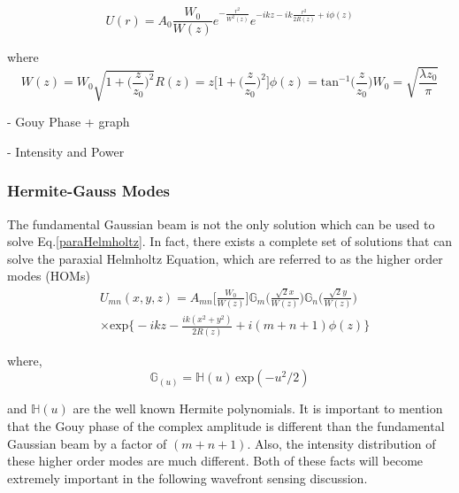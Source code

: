 \documentclass[oneside]{book}
\begin{document}
		\begin{equation}
		U(r) = A_0 \frac{W_0}{W(z)} e^{-\frac{r^2}{W^2(z)}} e^{-ikz - ik \frac{r^2}{2R(z)} + i \phi(z)}
		\end{equation}
		
		where
		\begin{subequations}
		\begin{equation}
		W(z) = W_0 \sqrt{1 + \bigg( \frac{z}{z_0} \bigg)^2}
		\end{equation}
		\begin{equation}
		R(z) = z \bigg[ 1 + \bigg( \frac{z}{z_0} \bigg)^2 \bigg]
		\end{equation}
		\begin{equation}
		\phi(z)= \text{tan}^{-1}\bigg(\frac{z}{z_0}\bigg)
		\end{equation}
		\begin{equation}
		W_0 = \sqrt{\frac{\lambda z_0}{\pi}}
		\end{equation}
		\end{subequations}

		
		- Gouy Phase + graph
		
		- Intensity and Power
		
		\subsubsection{Hermite-Gauss Modes}
		The fundamental Gaussian beam is not the only solution which can be used to solve Eq.\ref{paraHelmholtz}.  In fact, there exists a complete set of solutions that can solve the paraxial Helmholtz Equation, which are referred to as the higher order modes (HOMs)
		\begin{equation}\label{HG}
		\begin{aligned}
		&U_{mn}(x,y,z) = A_{mn}\bigg[ \frac{W_0}{W(z)} \bigg] \mathbb{G}_m\Bigg( \frac{\sqrt{2}x}{W(z)}  \Bigg) \mathbb{G}_n\Bigg( \frac{\sqrt{2}y}{W(z)} \Bigg)\\
		&\times \text{exp} \bigg\{ -ikz - \frac{ik(x^2+y^2)}{2R(z)} + i(m+n+1)\phi(z) \bigg\}
		\end{aligned}
		\end{equation}
		
		where,
		\begin{equation}
		\mathbb{G}_(u) = \mathbb{H}(u) \, \text{exp}(-u^2/2)
		\end{equation}
		
		and $ \mathbb{H}(u)$ are the well known Hermite polynomials.  It is important to mention that the Gouy phase of the complex amplitude is different than the fundamental Gaussian beam by a factor of $(m + n + 1)$. Also, the intensity distribution of these higher order modes are much different. Both of these facts will become extremely important in the following wavefront sensing discussion.
		
\end{document}
